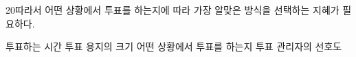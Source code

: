 \documentclass[fs85,seriesRus]{korfarm-base}
\begin{document}
\begin{kfSentenceUnit}{20}{따라서 어떤 상황에서 투표를 하는지에 따라 가장 알맞은 방식을 선택하는 지혜가 필요하다.}
\begin{kfChoices}
\kfChoice 투표하는 시간
\kfChoice 투표 용지의 크기
\kfChoice 어떤 상황에서 투표를 하는지
\kfChoice 투표 관리자의 선호도
\end{kfChoices}
\end{kfSentenceUnit}

\kfEndMC

\kfActivityBg \par{}\par\nopagebreak[4]\smallskip\nopagebreak[4]
\par\medskip{}
\end{document}
